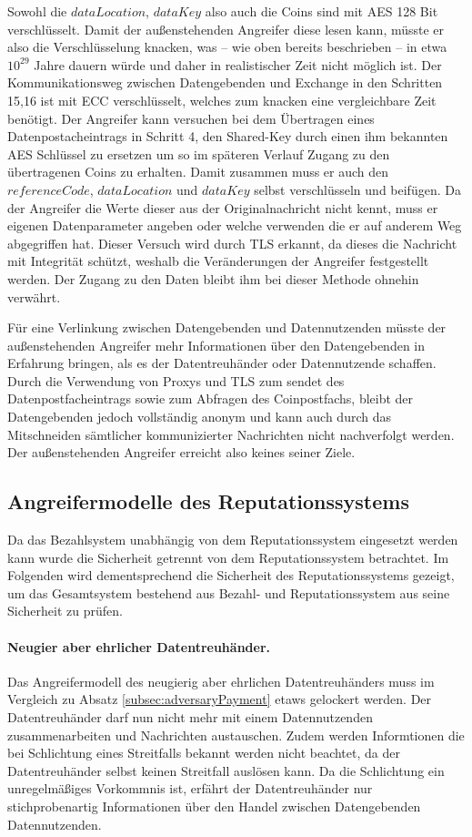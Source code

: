 \documentclass[
	fontsize=12pt,
	headings=small,
	parskip=half,           %
	bibliography=totoc,
	numbers=noenddot,       %
	open=any,               %
]{scrreprt}
\begin{document}
Sowohl die $dataLocation$, $dataKey$ also auch die Coins sind mit AES 128 Bit verschlüsselt. Damit der außenstehenden Angreifer diese lesen kann, müsste er also die Verschlüsselung knacken, was -- wie oben bereits beschrieben -- in etwa $10^{29}$ Jahre dauern würde und daher in realistischer Zeit nicht möglich ist. Der Kommunikationsweg zwischen Datengebenden und Exchange in den Schritten 15,16 ist mit ECC verschlüsselt, welches zum knacken eine vergleichbare Zeit benötigt. Der Angreifer kann versuchen bei dem Übertragen eines Datenpostacheintrags in Schritt 4, den Shared-Key durch einen ihm bekannten AES Schlüssel zu ersetzen um so im späteren Verlauf Zugang zu den übertragenen Coins zu erhalten. Damit zusammen muss er auch den $referenceCode$, $dataLocation$ und $dataKey$ selbst verschlüsseln und beifügen. Da der Angreifer die Werte dieser aus der Originalnachricht nicht kennt, muss er eigenen Datenparameter angeben oder welche verwenden die er auf anderem Weg abgegriffen hat. Dieser Versuch wird durch TLS erkannt, da dieses die Nachricht mit Integrität schützt, weshalb die Veränderungen der Angreifer festgestellt werden. Der Zugang zu den Daten bleibt ihm bei dieser Methode ohnehin verwährt. 

Für eine Verlinkung zwischen Datengebenden und Datennutzenden müsste der außenstehenden Angreifer mehr Informationen über den Datengebenden in Erfahrung bringen, als es der Datentreuhänder oder Datennutzende schaffen. Durch die Verwendung von Proxys und TLS zum sendet des Datenpostfacheintrags sowie zum Abfragen des Coinpostfachs, bleibt der Datengebenden jedoch vollständig anonym und kann auch durch das Mitschneiden sämtlicher kommunizierter Nachrichten nicht nachverfolgt werden. Der außenstehenden Angreifer erreicht also keines seiner Ziele.

\subsection{Angreifermodelle des Reputationssystems}
\label{subsec:adversaryRep}
Da das Bezahlsystem unabhängig von dem Reputationssystem eingesetzt werden kann wurde die Sicherheit getrennt von dem Reputationssystem betrachtet. Im Folgenden wird dementsprechend die Sicherheit des Reputationssystems gezeigt, um das Gesamtsystem bestehend aus Bezahl- und Reputationssystem aus seine Sicherheit zu prüfen.

\paragraph{Neugier aber ehrlicher Datentreuhänder.}
Das Angreifermodell des neugierig aber ehrlichen Datentreuhänders muss im Vergleich zu Absatz \ref{subsec:adversaryPayment} etaws gelockert werden. Der Datentreuhänder darf nun nicht mehr mit einem Datennutzenden zusammenarbeiten und Nachrichten austauschen. Zudem werden Informtionen die bei Schlichtung eines Streitfalls bekannt werden nicht beachtet, da der Datentreuhänder selbst keinen Streitfall auslösen kann. Da die Schlichtung ein unregelmäßiges Vorkommnis ist, erfährt der Datentreuhänder nur stichprobenartig Informationen über den Handel zwischen Datengebenden Datennutzenden. 
\end{document}

